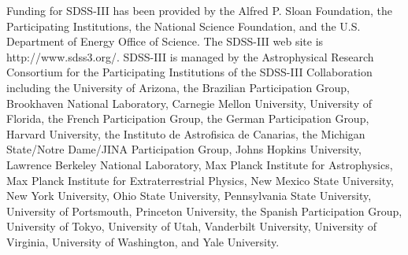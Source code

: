 \documentclass[iop]{emulateapj}
\begin{document}
Funding for SDSS-III has been provided by the Alfred P. Sloan Foundation, the Participating Institutions, the
National Science Foundation, and the U.S. Department of Energy Office of Science. 
The SDSS-III web site is http://www.sdss3.org/. 
SDSS-III is managed by the Astrophysical Research Consortium for the Participating Institutions
of the SDSS-III Collaboration including the University of Arizona, the Brazilian Participation Group, Brookhaven
National Laboratory, Carnegie Mellon University, University of Florida, the French Participation Group, 
the German Participation Group, Harvard University, the Instituto de Astrofisica de Canarias, the Michigan State/Notre
Dame/JINA Participation Group, Johns Hopkins University, Lawrence Berkeley National Laboratory, Max Planck
Institute for Astrophysics, Max Planck Institute for Extraterrestrial Physics, New Mexico State University, New
York University, Ohio State University, Pennsylvania State
University, University of Portsmouth, Princeton University,
the Spanish Participation Group, University of Tokyo, University of Utah, Vanderbilt University, University of Virginia, 
University of Washington, and Yale University.

\

\

\
\end{document}
